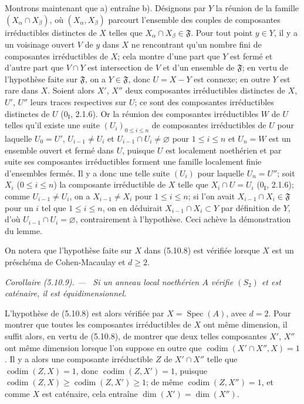 \documentclass[10pt,oneside]{book}
\newenvironment{corollary}[1][]{%
  \par\medskip\noindent\itshape Corollaire (#1). ---\ }{\par}
\begin{document}
Montrons maintenant que a) entraîne b). Désignons par $Y$ la réunion de la
famille $(X_\alpha\cap X_\beta)$, où $(X_\alpha,X_\beta)$ parcourt l'ensemble
des couples de composantes irréductibles distinctes de $X$ telles que
$X_\alpha\cap X_\beta\in\mathfrak F$. Pour tout point $y\in Y$, il y a un
voisinage ouvert $V$ de $y$ dans $X$ ne rencontrant qu'un nombre fini de
composantes irréductibles de $X$; cela montre d'une part que $Y$ est fermé et
d'autre part que $V\cap Y$ est intersection de $V$ et d'un ensemble de
$\mathfrak F$; en vertu de l'hypothèse faite sur $\mathfrak F$, on a
$Y\in\mathfrak F$, donc $U=X-Y$ est connexe; en outre $Y$ est rare dans $X$.
Soient alors $X'$, $X''$ deux composantes irréductibles distinctes de $X$,
$U'$, $U''$ leurs traces respectives sur $U$; ce sont des composantes
irréductibles distinctes de $U$ (0$_\mathrm I$, 2.1.6). Or la réunion des
composantes irréductibles $W$ de $U$ telles qu'il existe une suite
$(U_i)_{0\leq i\leq n}$ de composantes irréductibles de $U$ pour laquelle
$U_0=U'$, $U_{i-1}\neq U_i$ et $U_{i-1}\cap U_i\neq\varnothing$ pour
$1\leq i\leq n$ et $U_n=W$ est un ensemble ouvert et fermé dans $U$, puisque
$U$ est localement noethérien et par suite ses composantes irréductibles
forment une famille localement finie d'ensembles fermés. Il y a donc une telle
suite $(U_i)$ pour laquelle $U_n=U''$; soit $X_i$ ($0\leq i\leq n$) la
composante irréductible de $X$ telle que $X_i\cap U=U_i$
(0$_\mathrm I$, 2.1.6); comme $U_{i-1}\neq U_i$, on a
$X_{i-1}\neq X_i$ pour $1\leq i\leq n$; si l'on avait
$X_{i-1}\cap X_i\in\mathfrak F$ pour un $i$ tel que $1\leq i\leq n$, on en
déduirait $X_{i-1}\cap X_i\subset Y$ par définition de $Y$, d'où
$U_{i-1}\cap U_i=\varnothing$, contrairement à l'hypothèse. Ceci achève la
démonstration du lemme.

On notera que l'hypothèse faite sur $X$ dans (5.10.8) est vérifiée lorsque $X$
est un préschéma de Cohen-Macaulay et $d\geq2$.

\begin{corollary}[5.10.9]
\label{IV.2.s5.10.9-fr}
Si un anneau local noethérien $A$ vérifie $(S_2)$ et est caténaire, il est
équidimensionnel.
\end{corollary}

L'hypothèse de (5.10.8) est alors vérifiée par $X=\operatorname{Spec}(A)$,
avec $d=2$. Pour montrer que toutes les composantes irréductibles de $X$ ont
même dimension, il suffit alors, en vertu de (5.10.8), de montrer que deux
telles composantes $X'$, $X''$ ont même dimension lorsque l'on suppose en
outre que $\operatorname{codim}(X'\cap X'',X)=1$. Il y a alors une composante
irréductible $Z$ de $X'\cap X''$ telle que
$\operatorname{codim}(Z,X)=1$, donc $\operatorname{codim}(Z,X')=1$, puisque
$\operatorname{codim}(Z,X)\geq\operatorname{codim}(Z,X')\geq1$; de même
$\operatorname{codim}(Z,X'')=1$, et comme $X$ est caténaire, cela entraîne
$\dim(X')=\dim(X'')$.
\end{document}
